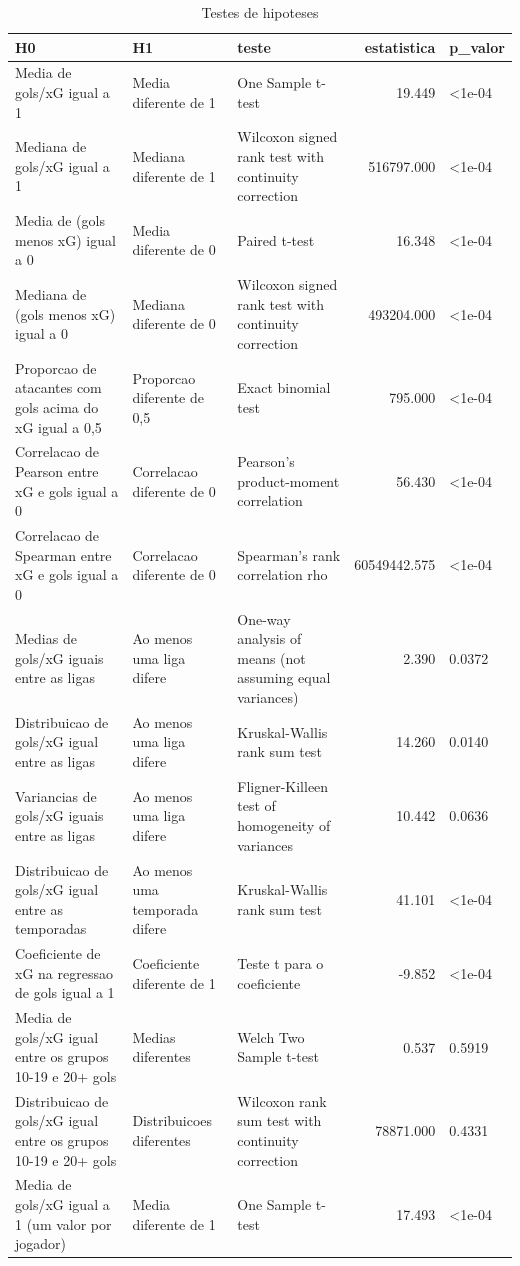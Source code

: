 \begin{table}

\caption{\label{tab:testes_g10}Testes de hipoteses}
\centering
\begin{tabular}[t]{lllrl}
\toprule
H0 & H1 & teste & estatistica & p\_valor\\
\midrule
Media de gols/xG igual a 1 & Media diferente de 1 & One Sample t-test & 19.449 & <1e-04\\
Mediana de gols/xG igual a 1 & Mediana diferente de 1 & Wilcoxon signed rank test with continuity correction & 516797.000 & <1e-04\\
Media de (gols menos xG) igual a 0 & Media diferente de 0 & Paired t-test & 16.348 & <1e-04\\
Mediana de (gols menos xG) igual a 0 & Mediana diferente de 0 & Wilcoxon signed rank test with continuity correction & 493204.000 & <1e-04\\
Proporcao de atacantes com gols acima do xG igual a 0,5 & Proporcao diferente de 0,5 & Exact binomial test & 795.000 & <1e-04\\
\addlinespace
Correlacao de Pearson entre xG e gols igual a 0 & Correlacao diferente de 0 & Pearson's product-moment correlation & 56.430 & <1e-04\\
Correlacao de Spearman entre xG e gols igual a 0 & Correlacao diferente de 0 & Spearman's rank correlation rho & 60549442.575 & <1e-04\\
Medias de gols/xG iguais entre as ligas & Ao menos uma liga difere & One-way analysis of means (not assuming equal variances) & 2.390 & 0.0372\\
Distribuicao de gols/xG igual entre as ligas & Ao menos uma liga difere & Kruskal-Wallis rank sum test & 14.260 & 0.0140\\
Variancias de gols/xG iguais entre as ligas & Ao menos uma liga difere & Fligner-Killeen test of homogeneity of variances & 10.442 & 0.0636\\
\addlinespace
Distribuicao de gols/xG igual entre as temporadas & Ao menos uma temporada difere & Kruskal-Wallis rank sum test & 41.101 & <1e-04\\
Coeficiente de xG na regressao de gols igual a 1 & Coeficiente diferente de 1 & Teste t para o coeficiente & -9.852 & <1e-04\\
Media de gols/xG igual entre os grupos 10-19 e 20+ gols & Medias diferentes & Welch Two Sample t-test & 0.537 & 0.5919\\
Distribuicao de gols/xG igual entre os grupos 10-19 e 20+ gols & Distribuicoes diferentes & Wilcoxon rank sum test with continuity correction & 78871.000 & 0.4331\\
Media de gols/xG igual a 1 (um valor por jogador) & Media diferente de 1 & One Sample t-test & 17.493 & <1e-04\\
\bottomrule
\end{tabular}
\end{table}
